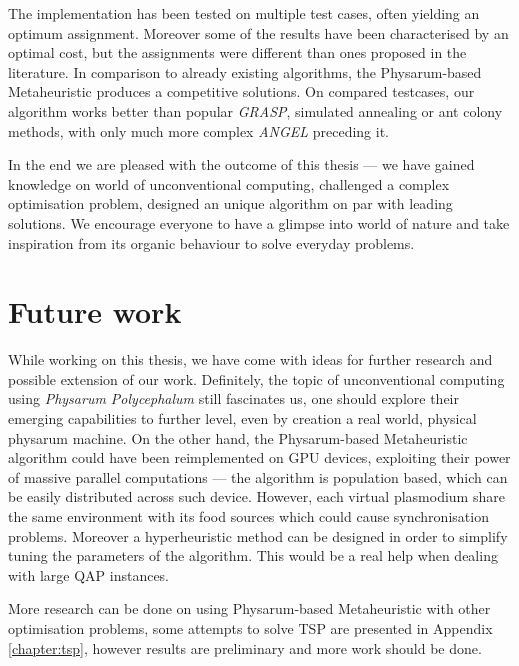 The implementation has been tested on multiple test cases, often yielding an optimum assignment. Moreover some of the results have been characterised by an optimal cost, but the assignments were different than ones proposed in the literature. In comparison to already existing algorithms, the Physarum-based Metaheuristic produces a competitive solutions. On compared testcases, our algorithm works better than popular \textit{GRASP}, simulated annealing or ant colony methods, with only much more complex \textit{ANGEL} preceding it.

In the end we are pleased with the outcome of this thesis --- we have gained knowledge on world of unconventional computing, challenged a complex optimisation problem, designed an unique algorithm on par with leading solutions. We encourage everyone to have a glimpse into world of nature and take inspiration from its organic behaviour to solve everyday problems.


\section*{Future work}

While working on this thesis, we have come with ideas for further research and possible extension of our work. Definitely, the topic of unconventional computing using \textit{Physarum Polycephalum} still fascinates us, one should explore their emerging capabilities to further level, even by creation a real world, physical physarum machine. On the other hand, the Physarum-based Metaheuristic algorithm could have been reimplemented on GPU devices, exploiting their power of massive parallel computations --- the algorithm is population based, which can be easily distributed across such device. However, each virtual plasmodium share the same environment with its food sources which could cause synchronisation problems. Moreover a hyperheuristic method can be designed in order to simplify tuning the parameters of the algorithm. This would be a real help when dealing with large QAP instances.

More research can be done on using Physarum-based Metaheuristic with other optimisation problems, some attempts to solve TSP are presented in Appendix \ref{chapter:tsp}, however results are preliminary and more work should be done.
